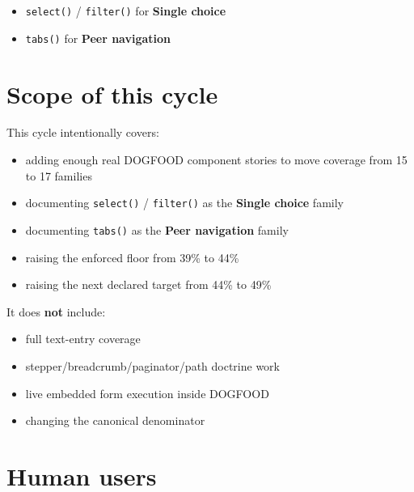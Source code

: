 \begin{itemize}
\tightlist
\item
  \texttt{s\allowbreak{}e\allowbreak{}l\allowbreak{}e\allowbreak{}c\allowbreak{}t\allowbreak{}(\allowbreak{})} / \texttt{f\allowbreak{}i\allowbreak{}l\allowbreak{}t\allowbreak{}e\allowbreak{}r\allowbreak{}(\allowbreak{})} for \textbf{Single choice}
\item
  \texttt{t\allowbreak{}a\allowbreak{}b\allowbreak{}s\allowbreak{}(\allowbreak{})} for \textbf{Peer navigation}
\end{itemize}

\section{Scope of this cycle}\label{record-072-scope-of-this-cycle}

This cycle intentionally covers:

\begin{itemize}
\tightlist
\item
  adding enough real DOGFOOD component stories to move coverage from 15 to 17 families
\item
  documenting \texttt{s\allowbreak{}e\allowbreak{}l\allowbreak{}e\allowbreak{}c\allowbreak{}t\allowbreak{}(\allowbreak{})} / \texttt{f\allowbreak{}i\allowbreak{}l\allowbreak{}t\allowbreak{}e\allowbreak{}r\allowbreak{}(\allowbreak{})} as the \textbf{Single choice} family
\item
  documenting \texttt{t\allowbreak{}a\allowbreak{}b\allowbreak{}s\allowbreak{}(\allowbreak{})} as the \textbf{Peer navigation} family
\item
  raising the enforced floor from 39\% to 44\%
\item
  raising the next declared target from 44\% to 49\%
\end{itemize}

It does \textbf{not} include:

\begin{itemize}
\tightlist
\item
  full text-entry coverage
\item
  stepper/breadcrumb/paginator/path doctrine work
\item
  live embedded form execution inside DOGFOOD
\item
  changing the canonical denominator
\end{itemize}

\section{Human users}\label{record-072-human-users}

